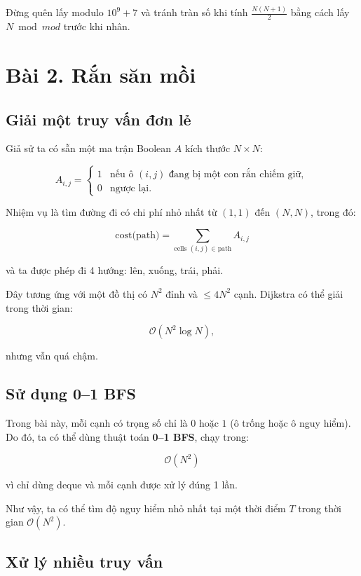 Đừng quên lấy modulo $10^9+7$ và tránh tràn số khi tính $\frac{N(N+1)}{2}$ bằng cách lấy $N \bmod mod$ trước khi nhân.

\newpage

\section*{Bài 2. Rắn săn mồi}

\subsection*{Giải một truy vấn đơn lẻ}

Giả sử ta có sẵn một ma trận Boolean $A$ kích thước $N \times N$:

\[
A_{i,j} = 
\begin{cases}
1 & \text{nếu ô $(i,j)$ đang bị một con rắn chiếm giữ}, \\
0 & \text{ngược lại}.
\end{cases}
\]

Nhiệm vụ là tìm đường đi có chi phí nhỏ nhất từ $(1,1)$ đến $(N,N)$, trong đó:

\[
\text{cost(path)} = \sum_{\text{cells } (i,j) \in \text{path}} A_{i,j}
\]

và ta được phép đi 4 hướng: lên, xuống, trái, phải.

Đây tương ứng với một đồ thị có $N^2$ đỉnh và $\le 4N^2$ cạnh.  
Dijkstra có thể giải trong thời gian:

\[
\mathcal{O}(N^2 \log N),
\]

nhưng vẫn quá chậm.

\subsection*{Sử dụng 0--1 BFS}

Trong bài này, mỗi cạnh có trọng số chỉ là $0$ hoặc $1$ (ô trống hoặc ô nguy hiểm).  
Do đó, ta có thể dùng thuật toán \textbf{0--1 BFS}, chạy trong:

\[
\mathcal{O}(N^2)
\]

vì chỉ dùng deque và mỗi cạnh được xử lý đúng 1 lần.

Như vậy, ta có thể tìm độ nguy hiểm nhỏ nhất tại một thời điểm $T$ trong thời gian $\mathcal{O}(N^2)$.

\subsection*{Xử lý nhiều truy vấn}

